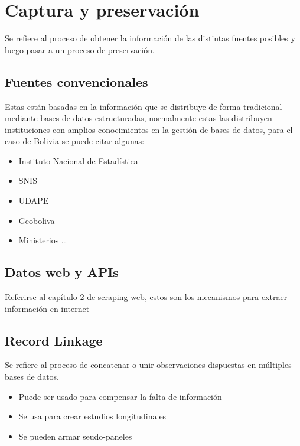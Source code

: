 \documentclass[
]{book}
\providecommand{\tightlist}{%
  \setlength{\itemsep}{0pt}\setlength{\parskip}{0pt}}
\begin{document}
\hypertarget{captura-y-preservaciuxf3n}{%
\section{Captura y preservación}\label{captura-y-preservaciuxf3n}}

Se refiere al proceso de obtener la información de las distintas fuentes posibles y luego pasar a un proceso de preservación.

\hypertarget{fuentes-convencionales}{%
\subsection{Fuentes convencionales}\label{fuentes-convencionales}}

Estas están basadas en la información que se distribuye de forma tradicional mediante bases de datos estructuradas, normalmente estas las distribuyen instituciones con amplios conocimientos en la gestión de bases de datos, para el caso de Bolivia se puede citar algunas:

\begin{itemize}
\tightlist
\item
  Instituto Nacional de Estadística
\item
  SNIS
\item
  UDAPE
\item
  Geoboliva
\item
  Ministerios \ldots{}
\end{itemize}

\hypertarget{datos-web-y-apis}{%
\subsection{Datos web y APIs}\label{datos-web-y-apis}}

Referirse al capítulo 2 de scraping web, estos son los mecanismos para extraer información en internet

\hypertarget{record-linkage}{%
\subsection{Record Linkage}\label{record-linkage}}

Se refiere al proceso de concatenar o unir observaciones dispuestas en múltiples bases de datos.

\begin{itemize}
\tightlist
\item
  Puede ser usado para compensar la falta de información
\item
  Se usa para crear estudios longitudinales
\item
  Se pueden armar seudo-paneles
\end{itemize}
\end{document}
